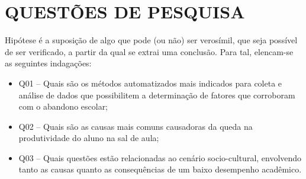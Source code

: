 % 
%


\chapter{QUESTÕES DE PESQUISA}
\label{chap:hipotese}



Hipótese é a suposição de algo que pode (ou não) ser verosímil, que seja possível de ser verificado, a partir da qual se extrai uma conclusão. Para tal, elencam-se as seguintes indagações:

\begin{itemize}
    \item Q01 -- Quais são os métodos automatizados mais indicados para coleta e análise de dados que possibilitem a determinação de fatores que corroboram com o abandono escolar;
    \item Q02 -- Quais são as causas mais comuns causadoras da queda na produtividade do aluno na sal de aula;
    \item Q03 -- Quais questões estão relacionadas ao cenário socio-cultural, envolvendo tanto as causas quanto as consequências de um baixo desempenho acadêmico.
\end{itemize}



